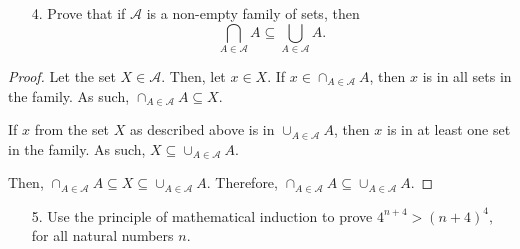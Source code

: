 \documentclass[10pt]{article}
\theoremstyle{definition}
\theoremstyle{plain}
\begin{document}
\pagebreak



\begin{enumerate}
  \item[4.] Prove that if $\mathcal{A}$ is a non-empty family of sets, then $$\bigcap_{A \in \mathcal{A}}A \subseteq \bigcup_{A \in \mathcal{A}} A.$$
\end{enumerate}

\begin{proof}
  Let the set $X\in\mathcal{A}$. Then, let $x\in X$. If $x\in \cap_{A \in \mathcal{A}}A$, then $x$ is in all sets in the family. As such, $\cap_{A \in \mathcal{A}}A \subseteq X$. \\

  \par If $x$ from the set $X$ as described above is in $\cup_{A \in \mathcal{A}}A$, then $x$ is in at least one set in the family. As such, $X \subseteq \cup_{A \in \mathcal{A}}A$. \\

  \par Then, $\cap_{A \in \mathcal{A}}A \subseteq X \subseteq \cup_{A \in \mathcal{A}}A$. Therefore, $\cap_{A \in \mathcal{A}}A \subseteq \cup_{A \in \mathcal{A}}A$.
\end{proof}



\pagebreak



\begin{enumerate}
  \item[5.] Use the principle of mathematical induction to prove $4^{n+4} > (n+4)^4,$ for all natural numbers $n$.
\end{enumerate}
\end{document}

